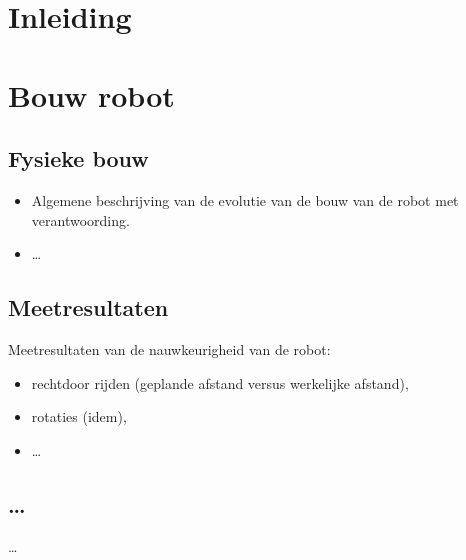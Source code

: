\documentclass[eind]{penoverslag}
\begin{document}

\maketitlepage

\begin{abstract}
\lipsum[1-2]
\end{abstract}

\tableofcontents

\newpage

\section{Inleiding}
\lipsum[1-2]

\section{Bouw robot}
\lipsum[3]

\subsection{Fysieke bouw}
\begin{itemize}
\item Algemene beschrijving van de evolutie van de bouw van de robot met verantwoording.
\item \ldots
\end{itemize}

\subsection{Meetresultaten}
Meetresultaten van de nauwkeurigheid van de robot:
\begin{itemize}
\item rechtdoor rijden (geplande afstand versus werkelijke afstand),
\item rotaties (idem),
\item \ldots
\end{itemize}

\subsection{\ldots}
\ldots
\end{document}
